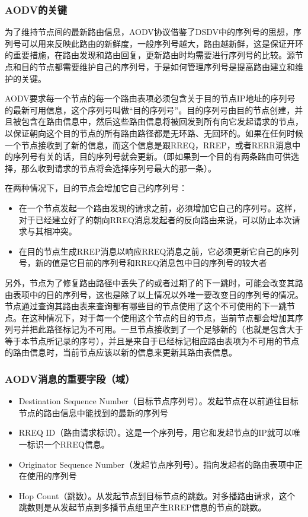 \documentclass[12pt,a4paper]{article}
\begin{document}
\subsubsection{AODV的关键}
为了维持节点间的最新路由信息，AODV协议借鉴了DSDV中的序列号的思想，序列号可以用来反映此路由的新鲜度，一般序列号越大，路由越新鲜，这是保证开环的重要措施，在路由发现和路由回复，更新路由时均需要进行序列号的比较。源节点和目的节点都需要维护自己的序列号，于是如何管理序列号是提高路由建立和维护的关键。

AODV要求每一个节点的每一个路由表项必须包含关于目的节点IP地址的序列号的最新可用信息，这个序列号叫做“目的序列号”。目的序列号由目的节点创建，并且被包含在路由信息中，然后这些路由信息将被回发到所有向它发起请求的节点，以保证朝向这个目的节点的所有路由路径都是无环路、无回环的。如果在任何时候一个节点接收到了新的信息，而这个信息是跟RREQ，RREP，或者RERR消息中的序列号有关的话，目的序列号就会更新。（即如果到一个目的有两条路由可供选择，那么收到请求的节点将会选择序列号最大的那一条）。

在两种情况下，目的节点会增加它自己的序列号：
\begin{itemize}
	\item 在一个节点发起一个路由发现的请求之前，必须增加它自己的序列号。这样，对于已经建立好了的朝向RREQ消息发起者的反向路由来说，可以防止本次请求与其相冲突。
	\item 在目的节点生成RREP消息以响应RREQ消息之前，它必须更新它自己的序列号，新的值是它目前的序列号和RREQ消息包中目的序列号的较大者
\end{itemize}

另外，节点为了修复路由路径中丢失了的或者过期了的下一跳时，可能会改变其路由表项中的目的序列号，这也是除了以上情况以外唯一要改变目的序列号的情况。节点通过查询其路由表来查询都有哪些目的节点使用了这个不可使用的下一跳节点。在这种情况下，对于每一个使用这个节点的目的节点，当前节点都会增加其序列号并把此路径标记为不可用。一旦节点接收到了一个足够新的（也就是包含大于等于本节点所记录的序号），并且是来自于已经标记相应路由表项为不可用的节点的路由信息时，当前节点应该以新的信息来更新其路由表信息。

\subsubsection{AODV消息的重要字段（域）}
\begin{itemize}
	\item Destination Sequence Number（目标节点序列号）。发起节点在以前通往目标节点的路由信息中能找到的最新的序列号
	\item RREQ ID（路由请求标识）。这是一个序列号，用它和发起节点的IP就可以唯一标识一个RREQ信息。
	\item Originator Sequence Number（发起节点序列号）。指向发起者的路由表项中正在使用的序列号
	\item Hop Count（跳数）。从发起节点到目标节点的跳数。对多播路由请求，这个跳数则是从发起节点到多播节点组里产生RREP信息的节点的跳数。
\end{itemize}
\end{document}
